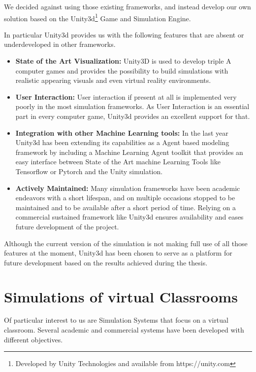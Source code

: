 \bb

We decided against using those existing frameworks, and instead develop
our own solution based on the Unity3d\footnote{Developed by Unity Technologies and available from https://unity.com}
Game and Simulation Engine.

In particular Unity3d provides us with the following features that are absent
or underdeveloped in other frameworks.

\begin{itemize}
    \item \textbf{State of the Art Visualization:} Unity3D is used to develop triple
    A computer games and provides the possibility to build simulations with realistic
    appearing visuals and even virtual reality environments.
    \item \textbf{User Interaction:} User interaction if present at all is implemented
    very poorly in the most simulation frameworks. As User Interaction is an essential
    part in every computer game, Unity3d provides an excellent support for that.
    \item \textbf{Integration with other Machine Learning tools:} In the last year
    Unity3d has been extending its capabilities as a Agent based modeling framework
    by including a Machine Learning Agent toolkit that provides an easy
    interface between State of the Art machine Learning Tools like Tensorflow or Pytorch
    and the Unity simulation.
    \item \textbf{Actively Maintained:} Many simulation frameworks have been academic endeavors
    with a short lifespan, and on multiple occasions stopped to be maintained and
    to be available after a short period of time. Relying on a commercial sustained
    framework like Unity3d ensures availability and eases future development of
    the project.
\end{itemize}

Although the current version of the simulation is not making full use of all those
features at the moment, Unity3d has been chosen to serve as a platform for future
development based on the results achieved during the thesis.

\section{Simulations of virtual Classrooms}
Of particular interest to us are Simulation Systems that focus on a virtual classroom. 
Several academic and commercial systems have been developed with different objectives.


